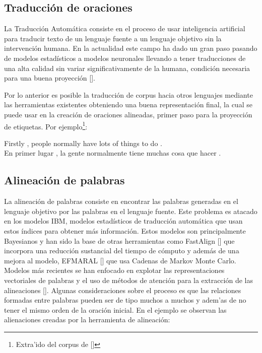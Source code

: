 \subsection{Traducción de oraciones}

La Traducción Automática consiste en el proceso de usar inteligencia artificial para
traducir texto de un lenguaje fuente a un lenguaje objetivo sin la intervención humana.
En la actualidad este campo ha dado un gran paso pasando de modelos estadísticos a modelos
neuronales llevando a tener traducciones de una alta calidad sin variar significativamente de la humana, 
condición necesaria para una buena proyección [\cite{eger2018cross}].

Por lo anterior es posible la traducción de corpus hacia otros lenguajes mediante las
herramientas existentes obteniendo una buena representación final, la cual se puede usar en la creación de
oraciones alineadas, primer paso para la proyección de etiquetas. Por ejemplo\footnote{Extra'ido del corpus de [\cite{stab2017parsing}]}:

\begin{adjustwidth}{25pt}{25pt}
	Firstly , people normally have lots of things to do . \\
	En primer lugar , la gente normalmente tiene muchas cosa que hacer .
\end{adjustwidth}

\subsection{Alineación de palabras}

La alineación de palabras consiste en encontrar las palabras generadas en el lenguaje objetivo por las 
palabras en el lenguaje fuente.
Este problema es atacado en los modelos IBM, modelos estadísticos de traducción automática que usan estos 
índices para obtener más información. Estos modelos son principalmente Bayesianos y han sido la base de
otras herramientas como FastAlign [\cite{dyer2013fastalign}] que incorpora una reducción sustancial del
tiempo de cómputo y además de una mejora al modelo, EFMARAL [\cite{ostling2016efficient}] que usa
Cadenas de Markov Monte Carlo. Modelos más recientes se han enfocado en explotar las representaciones
vectoriales de palabras y el uso de métodos de atención para la extracción de las
alineaciones [\cite{dou2021word}]. Algunas consideraciones sobre el proceso es que las relaciones 
formadas entre palabras pueden ser de tipo muchos a muchos y adem'as de no tener el mismo orden de la 
oración inicial. En el ejemplo se observan las alienaciones creadas por la herramienta de alineación:

